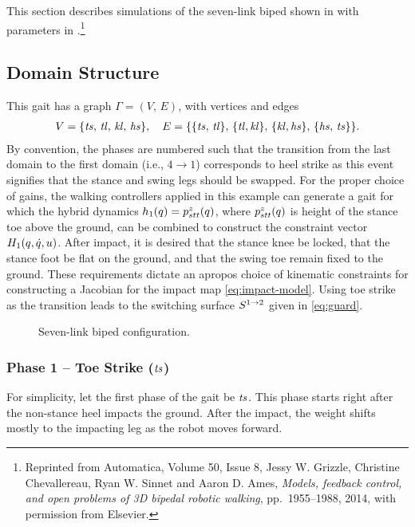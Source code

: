 This section describes simulations of the seven-link biped shown in
 with parameters in
.\footnote{%
  Reprinted from Automatica, Volume 50, Issue 8, Jessy W. Grizzle, Christine
  Chevallereau, Ryan W. Sinnet and Aaron D. Ames,  {\em Models, feedback
    control, and open problems of 3D bipedal robotic walking}, pp.~1955--1988,
  2014, with permission from Elsevier.}

\subsection{Domain Structure}

This gait has a graph $\Gamma = (V, \, E)$, with vertices and edges
\begin{align*}
  V = \{\mathit{ts}, \, \mathit{tl}, \, \mathit{kl}, \, \mathit{hs}\}, \quad  E = \{\{\mathit{ts}, \, \mathit{tl}\}, \, \{\mathit{tl}, \mathit{kl}\}, \, \{\mathit{kl}, \mathit{hs}\}, \, \{\mathit{hs}, \,
  \mathit{ts}\}\}.
\end{align*}
By convention, the phases are numbered such that the transition from the last
domain to the first domain (i.e., $4 \to 1$) corresponds to heel strike as this
event signifies that the stance and swing legs should be swapped.
% 
For the proper choice of gains, the walking controllers applied in this example
can generate a gait for which the hybrid dynamics $h_{1}(q) = p_{stt}^{z}(q)$,
where $p_{stt}^{z}(q)$ is height of the stance toe above the ground, can be
combined to construct the constraint vector $H_{1}(q, \dot{q}, u)$. 
% 
After impact, it is desired that the stance knee be locked, that the stance foot
be flat on the ground, and that the swing toe remain fixed to the ground.
% 
These requirements dictate an apropos choice of kinematic constraints for
constructing a Jacobian for the impact map \eqref{eq:impact-model}.
% 
Using toe strike as the transition leads to the switching surface
$S^{1 \to 2}$ given in \eqref{eq:guard}.
%
\begin{figure}[t!]
  \centering
  \def\svgwidth{0.5\columnwidth}
  
  \caption{Seven-link biped configuration.}
  \label{fig:7link-model}
\end{figure}


\subsubsection{Phase 1 -- Toe Strike ($\mathit{ts}$)}

For simplicity, let the first phase of the gait be $\mathit{ts}$.
%
This phase starts right after the non-stance heel impacts the ground.
%
After the impact, the weight shifts mostly to the impacting leg as the robot
moves forward.



